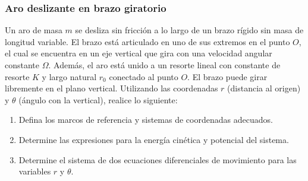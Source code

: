 \subsubsection{Aro deslizante en brazo giratorio}

Un aro de masa $m$ se desliza sin fricción a lo largo de un brazo rígido sin masa de longitud variable. El brazo está articulado en uno de sus extremos en el punto $O$, el cual se encuentra en un eje vertical que gira con una velocidad angular constante $\Omega$. Además, el aro está unido a un resorte lineal con constante de resorte $K$ y largo natural $r_0$ conectado al punto $O$. El brazo puede girar libremente en el plano vertical. Utilizando las coordenadas $r$ (distancia al origen) y $\theta$ (ángulo con la vertical), realice lo siguiente:

\begin{enumerate}
    \item Defina los marcos de referencia y sistemas de coordenadas adecuados.
    \item Determine las expresiones para la energía cinética y potencial del sistema.
    \item  Determine el sistema de dos ecuaciones diferenciales de movimiento para las variables $r$ y $\theta$.
\end{enumerate}

